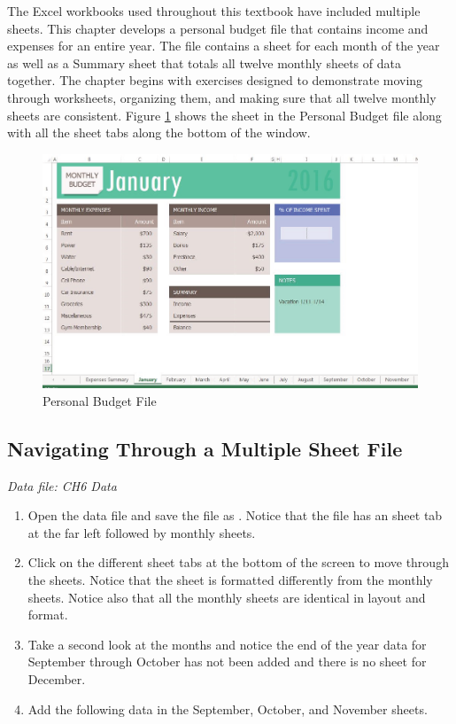 The Excel workbooks used throughout this textbook have included multiple sheets. This chapter develops a personal budget file that contains income and expenses for an entire year. The file contains a sheet for each month of the year as well as a Summary sheet that totals all twelve monthly sheets of data together. The chapter begins with exercises designed to demonstrate moving through worksheets, organizing them, and making sure that all twelve monthly sheets are consistent. Figure \ref{06:fig01} shows the  sheet in the Personal Budget file along with all the sheet tabs along the bottom of the window.

\begin{figure}[H]
	\centering
	\includegraphics[width=\maxwidth{.95\linewidth}]{gfx/ch06_fig01}
	\caption{Personal Budget File}
	\label{06:fig01}
\end{figure}

\subsection{Navigating Through a Multiple Sheet File}

\textit{Data file: CH6 Data}

\begin{enumerate}
	\item Open the data file  and save the file as . Notice that the file has an  sheet tab at the far left followed by monthly sheets.
	\item Click on the different sheet tabs at the bottom of the screen to move through the sheets. Notice that the  sheet is formatted differently from the monthly sheets. Notice also that all the monthly sheets are identical in layout and format.
	\item Take a second look at the months and notice the end of the year data for September through October has not been added and there is no sheet for December. 
	\item Add the following data in the September, October, and November sheets.
\end{enumerate}

